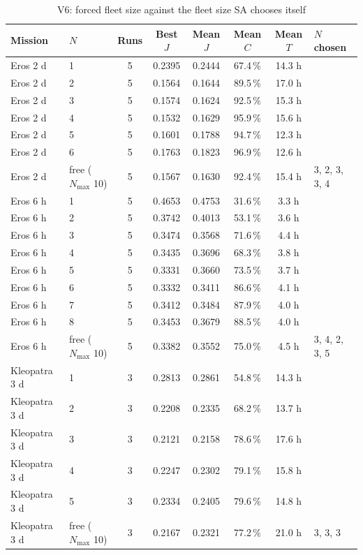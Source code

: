 \begin{table}[htbp]
\centering
\caption{V6: forced fleet size against the fleet size \ac{SA} chooses itself}
\label{tab:v6}
\scriptsize
\begin{tabular}{@{}llcccccl@{}}
\toprule
Mission & $N$ & Runs & Best $J$ & Mean $J$ & Mean $C$ & Mean $T$ & $N$ chosen \\
\midrule
Eros 2 d & 1 & 5 & 0.2395 & 0.2444 & 67.4\,\% & 14.3 h &  \\
Eros 2 d & 2 & 5 & 0.1564 & 0.1644 & 89.5\,\% & 17.0 h &  \\
Eros 2 d & 3 & 5 & 0.1574 & 0.1624 & 92.5\,\% & 15.3 h &  \\
Eros 2 d & 4 & 5 & 0.1532 & 0.1629 & 95.9\,\% & 15.6 h &  \\
Eros 2 d & 5 & 5 & 0.1601 & 0.1788 & 94.7\,\% & 12.3 h &  \\
Eros 2 d & 6 & 5 & 0.1763 & 0.1823 & 96.9\,\% & 12.6 h &  \\
Eros 2 d & free ($N_{\max}$ 10) & 5 & 0.1567 & 0.1630 & 92.4\,\% & 15.4 h & 3, 2, 3, 3, 4 \\
Eros 6 h & 1 & 5 & 0.4653 & 0.4753 & 31.6\,\% & 3.3 h &  \\
Eros 6 h & 2 & 5 & 0.3742 & 0.4013 & 53.1\,\% & 3.6 h &  \\
Eros 6 h & 3 & 5 & 0.3474 & 0.3568 & 71.6\,\% & 4.4 h &  \\
Eros 6 h & 4 & 5 & 0.3435 & 0.3696 & 68.3\,\% & 3.8 h &  \\
Eros 6 h & 5 & 5 & 0.3331 & 0.3660 & 73.5\,\% & 3.7 h &  \\
Eros 6 h & 6 & 5 & 0.3332 & 0.3411 & 86.6\,\% & 4.1 h &  \\
Eros 6 h & 7 & 5 & 0.3412 & 0.3484 & 87.9\,\% & 4.0 h &  \\
Eros 6 h & 8 & 5 & 0.3453 & 0.3679 & 88.5\,\% & 4.0 h &  \\
Eros 6 h & free ($N_{\max}$ 10) & 5 & 0.3382 & 0.3552 & 75.0\,\% & 4.5 h & 3, 4, 2, 3, 5 \\
Kleopatra 3 d & 1 & 3 & 0.2813 & 0.2861 & 54.8\,\% & 14.3 h &  \\
Kleopatra 3 d & 2 & 3 & 0.2208 & 0.2335 & 68.2\,\% & 13.7 h &  \\
Kleopatra 3 d & 3 & 3 & 0.2121 & 0.2158 & 78.6\,\% & 17.6 h &  \\
Kleopatra 3 d & 4 & 3 & 0.2247 & 0.2302 & 79.1\,\% & 15.8 h &  \\
Kleopatra 3 d & 5 & 3 & 0.2334 & 0.2405 & 79.6\,\% & 14.8 h &  \\
Kleopatra 3 d & free ($N_{\max}$ 10) & 3 & 0.2167 & 0.2321 & 77.2\,\% & 21.0 h & 3, 3, 3 \\
\bottomrule
\end{tabular}
\end{table}
